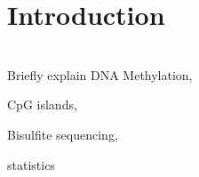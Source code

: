 \section{Introduction}
\\
Briefly explain DNA Methylation, 

CpG islands, 

Bisulfite sequencing, 

statistics
  
  
  
  
  
  
  
